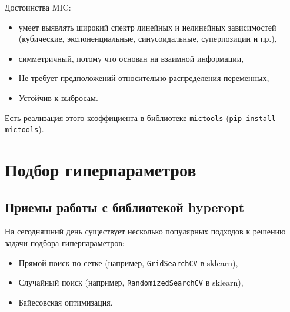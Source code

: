 \documentclass[%
	11pt,
	a4paper,
	utf8,
		]{article}
\begin{document}
Достоинства MIC:
\begin{itemize}
	\item умеет выявлять широкий спектр линейных и нелинейных зависимостей (кубические, экспоненциальные, синусоидальные, суперпозиции и пр.),
	
	\item симметричный, потому что основан на взаимной информации,
	
	\item Не требует предположений относительно распределения переменных,
	
	\item Устойчив к выбросам.
\end{itemize}

Есть реализация этого коэффициента в библиотеке \texttt{mictools} (\verb|pip install mictools|).


\section{Подбор гиперпараметров}

\subsection{Приемы работы с библиотекой hyperopt}

На сегодняшний день существует несколько популярных подходов к решению задачи подбора гиперпараметров:
\begin{itemize}
	\item Прямой поиск по сетке (например, \texttt{GridSearchCV} в sklearn),
	
	\item Случайный поиск (например, \texttt{RandomizedSearchCV} в sklearn),
	
	\item Байесовская оптимизация.
\end{itemize}
\end{document}
